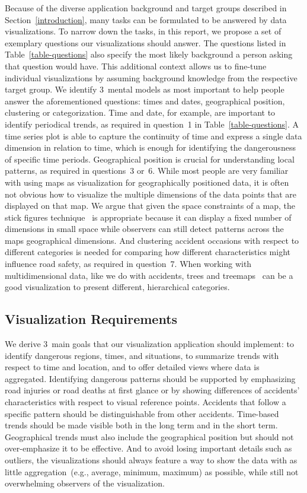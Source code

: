 Because of the diverse application background and target groups described in Section~\ref{introduction}, many tasks can be formulated to be answered by data visualizations. To narrow down the tasks, in this report, we propose a set of exemplary questions our visualizations should answer. The questions listed in Table~\ref{table-questions} also specify the most likely background a person asking that question would have. This additional context allows us to fine-tune individual visualizations by assuming background knowledge from the respective target group.
We identify 3~mental models as most important to help people answer the aforementioned questions: \Ni times and dates, \Nii geographical position, \Niii clustering or categorization.
Time and date, for example, are important to identify periodical trends, as required in question~1 in Table~\ref{table-questions}. A time series plot is able to capture the continuity of time and express a single data dimension in relation to time, which is enough for identifying the dangerousness of specific time periods.
Geographical position is crucial for understanding local patterns, as required in questions~3 or~6. While most people are very familiar with using maps as visualization for geographically positioned data, it is often not obvious how to visualize the multiple dimensions of the data points that are displayed on that map. We argue that given the space constraints of a map, the stick figures technique~\cite{PickettG1988} is appropriate because it can display a fixed number of dimensions in small space while observers can still detect patterns across the maps geographical dimensions.
And clustering accident occasions with respect to different categories is needed for comparing how different characteristics might influence road safety, as required in question~7. When working with multidimensional data, like we do with accidents, trees and treemaps~\cite{Shneiderman1992} can be a good visualization to present different, hierarchical categories.

\subsection{Visualization Requirements}
\label{requirements}
We derive 3~main goals that our visualization application should implement: \Ni to identify dangerous regions, times, and situations, \Nii to summarize trends with respect to time and location, and \Niii to offer detailed views where data is aggregated.
Identifying dangerous patterns should be supported by emphasizing road injuries or road deaths at first glance or by showing differences of accidents' characteristics with respect to visual reference points.
Accidents that follow a specific pattern should be distinguishable from other accidents.
Time-based trends should be made visible both in the long term and in the short term. Geographical trends must also include the geographical position but should not over-emphasize it to be effective.
And to avoid losing important details such as outliers, the visualizations should always feature a way to show the data with as little aggregation~(e.g., average, minimum, maximum) as possible, while still not overwhelming observers of the visualization.

